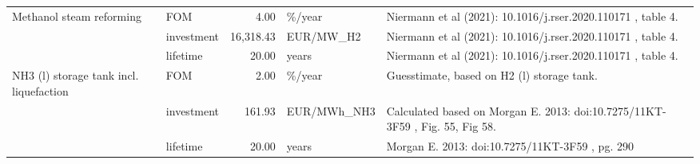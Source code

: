 \begin{longtable}{p{5cm}p{3cm}rp{3cm}p{11cm}}
Methanol steam reforming & FOM &           4.00 &                            \%/year &                                                                                                                                                                                                                                                                         Niermann et al (2021): 10.1016/j.rser.2020.110171 , table 4. \\
                      & investment &      16,318.43 &                         EUR/MW\_H2 &                                                                                                                                                                                                                                                                         Niermann et al (2021): 10.1016/j.rser.2020.110171 , table 4. \\
                      & lifetime &          20.00 &                             years &                                                                                                                                                                                                                                                                         Niermann et al (2021): 10.1016/j.rser.2020.110171 , table 4. \\
NH3 (l) storage tank incl. liquefaction & FOM &           2.00 &                            \%/year &                                                                                                                                                                                                                                                                                           Guesstimate, based on H2 (l) storage tank. \\
                      & investment &         161.93 &                       EUR/MWh\_NH3 &                                                                                                                                                                                                                                                         Calculated based on Morgan E. 2013: doi:10.7275/11KT-3F59 , Fig. 55, Fig 58. \\
                      & lifetime &          20.00 &                             years &                                                                                                                                                                                                                                                                                      Morgan E. 2013: doi:10.7275/11KT-3F59 , pg. 290 \\

\end{longtable}
